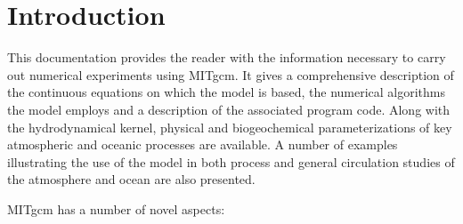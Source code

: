 








\section{Introduction}

This documentation provides the reader with the information necessary to
carry out numerical experiments using MITgcm. It gives a comprehensive
description of the continuous equations on which the model is based, the
numerical algorithms the model employs and a description of the associated
program code. Along with the hydrodynamical kernel, physical and
biogeochemical parameterizations of key atmospheric and oceanic processes
are available. A number of examples illustrating the use of the model in
both process and general circulation studies of the atmosphere and ocean are
also presented.

MITgcm has a number of novel aspects:

